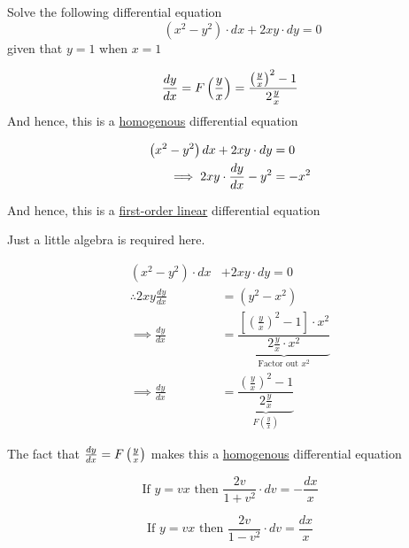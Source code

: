 \documentclass[14pt,fleqn]{extarticle}
\begin{document}
\begin{question}
\statement
	
Solve the following differential equation 
\[ \qquad (x^2-y^2)\cdot dx +2xy\cdot dy = 0 \]
given that $y=1$ when $x=1$
%
\begin{step}
	\begin{options}
		\correct

		\[\frac{dy}{dx} = F\left( \frac{y}{x}\right) = \dfrac{\left(\frac{y}{x}\right)^2 - 1}{2\frac{y}{x}} \]
		And hence, this is a \underline{homogenous} differential equation

		\incorrect
		
		\begin{align}
		\left(x^2-y^2 \right) dx + 2xy\cdot dy &= 0  \\
		\implies 2xy\cdot\frac{dy}{dx} - y^2 &= -x^2 
\end{align}

And hence, this is a \underline{first-order linear} differential equation

	\end{options}
	\reason

Just a little algebra is required here. 

%
\begin{align}
(x^2-y^2)\cdot dx &+2xy\cdot dy = 0 \\
\therefore 2xy\frac{dy}{dx} &= (y^2-x^2)  \\ 
\implies \frac{dy}{dx} &= \underbrace{\dfrac{\left[\left( \frac{y}{x}\right)^2 - 1\right]\cdot x^2}{2\frac{y}{x}\cdot x^2}}_{\text{Factor out $x^2$}}\\
\implies \frac{dy}{dx} &= 
\underbrace{\dfrac{\left(\frac{y}{x}\right)^2 - 1}{2\frac{y}{x}}}_{F\left( \frac{y}{x}\right)}
\end{align}

The fact that $\frac{dy}{dx} = F \left(\frac{y}{x} \right)$ makes this a 
\underline{homogenous} differential equation

\end{step}
\begin{step}
	\begin{options}
		\correct

		\[\text{If } y = vx\text{ then } \frac{2v}{1+v^2}\cdot dv = -\frac{dx}{x}\]

		\incorrect

		\[\text{If } y = vx\text{ then }\frac{2v}{1- v^2}\cdot dv = \frac{dx}{x}\]

	\end{options}
	\reason


\end{step}
\end{question}
\end{document}
